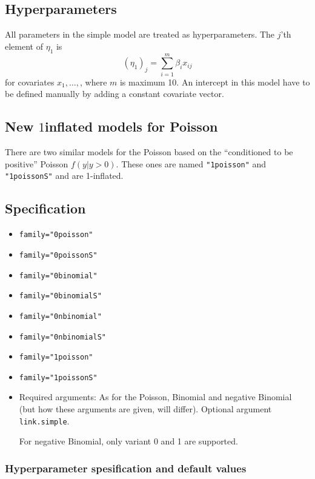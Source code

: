 \documentclass[a4paper,11pt]{article}
\begin{document}
\subsection*{Hyperparameters}

All parameters in the simple model are treated as hyperparameters.
The $j$'th element of $\eta_1$ is
\begin{displaymath}
    (\eta_1)_j = \sum_{i=1}^{m} \beta_i x_{ij}
\end{displaymath}
for covariates $x_1, \ldots, $, where $m$ is maximum 10. An intercept
in this model have to be defined manually by adding a constant
covariate vector.

\subsection*{New $1$inflated models for Poisson}

There are two similar models for the Poisson based on  the ``conditioned to be
positive'' Poisson $f(y | y > 0)$. These ones are named
\texttt{"1poisson"} and \texttt{"1poissonS"} and are 1-inflated.


\subsection*{Specification}

\begin{itemize}
\item \texttt{family="0poisson"}
\item \texttt{family="0poissonS"}
\item \texttt{family="0binomial"}
\item \texttt{family="0binomialS"}
\item \texttt{family="0nbinomial"}
\item \texttt{family="0nbinomialS"}
\item \texttt{family="1poisson"}
\item \texttt{family="1poissonS"}
\item Required arguments: As for the Poisson, Binomial and negative
    Binomial (but how these arguments are given, will differ).
    Optional argument \texttt{link.simple}.

    For negative Binomial, only variant 0 and 1 are supported.
\end{itemize}

\clearpage
\subsubsection*{Hyperparameter spesification and default values}
\end{document}
